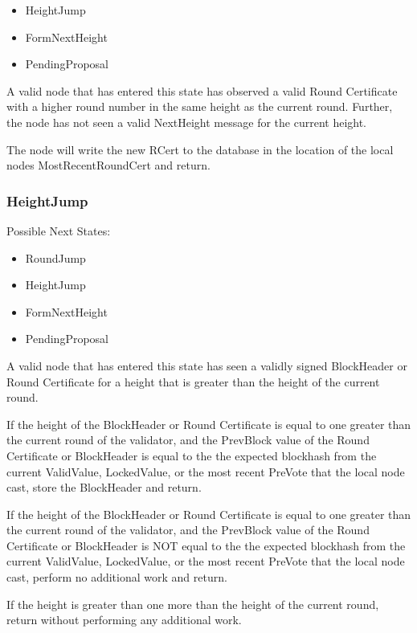 \begin{itemize}
    \item HeightJump
    \item FormNextHeight
    \item PendingProposal
\end{itemize}

A valid node that has entered this state has observed a valid Round
Certificate with a higher round number in the same height as the
current round.
Further, the node has not seen a valid NextHeight message for the
current height.

The node will write the new RCert to the database in the location of
the local nodes MostRecentRoundCert and return.


\subsubsection{HeightJump}

Possible Next States:

\begin{itemize}
    \item RoundJump
    \item HeightJump
    \item FormNextHeight
    \item PendingProposal
\end{itemize}

A valid node that has entered this state has seen a validly signed
BlockHeader or Round Certificate for a height that is greater than the
height of the current round.

If the height of the BlockHeader or Round Certificate is equal to one
greater than the current round of the validator, and the PrevBlock
value of the Round Certificate or BlockHeader is equal to the the
expected blockhash from the current ValidValue, LockedValue, or the
most recent PreVote that the local node cast, store the BlockHeader and
return.

If the height of the BlockHeader or Round Certificate is equal to one
greater than the current round of the validator, and the PrevBlock
value of the Round Certificate or BlockHeader is NOT equal to the the
expected blockhash from the current ValidValue, LockedValue, or the
most recent PreVote that the local node cast, perform no additional
work and return.

If the height is greater than one more than the height of the current
round, return without performing any additional work.


